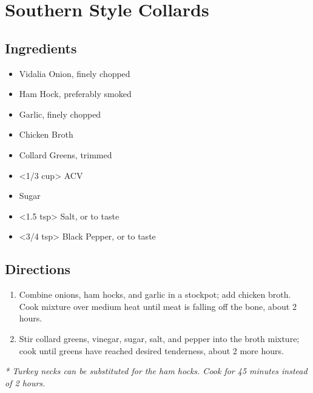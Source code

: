 \section{Southern Style Collards}

\subsection{ Ingredients }

\begin{itemize}
  \item <2 onions> Vidalia Onion, finely chopped
  \item <3 lbs> Ham Hock, preferably smoked
  \item <4 cloves> Garlic, finely chopped
  \item <32 oz> Chicken Broth
  \item <3 lbs> Collard Greens, trimmed
  \item <1/3 cup> ACV
  \item <2 tbs> Sugar
  \item <1.5 tsp> Salt, or to taste
  \item <3/4 tsp> Black Pepper, or to taste
\end{itemize}

\subsection{ Directions }

\begin{enumerate}
  \item Combine onions, ham hocks, and garlic in a stockpot; add chicken broth. Cook mixture over medium heat until meat is falling off the bone, about 2 hours.
  \item Stir collard greens, vinegar, sugar, salt, and pepper into the broth mixture; cook until greens have reached desired tenderness, about 2 more hours.
\end{enumerate}

\textit{* Turkey necks can be substituted for the ham hocks. Cook for 45 minutes instead of 2 hours. }
